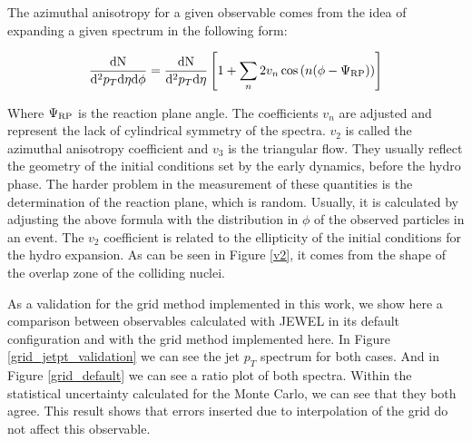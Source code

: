 


The azimuthal anisotropy for a given observable comes from the idea of expanding a given spectrum in the following form:

\begin{equation}
\frac{{\rm dN}}{{\rm d}^2p_T {\rm d}\eta {\rm d}\phi } = \frac{{\rm dN}}{{\rm d}^2p_T {\rm d}\eta } \left[ 1 + \sum_n 2 v_n \cos \left( n ( \phi - \Psi_{\rm RP} ) \right) \right]
\end{equation}

Where $\Psi_{\rm RP}$ is the reaction plane angle. The coefficients $v_n$ are adjusted and represent the lack of cylindrical symmetry of the spectra. $v_2$ is called the azimuthal anisotropy coefficient and $v_3$ is the triangular flow. They usually reflect the geometry of the initial conditions set by the early dynamics, before the hydro phase. The harder problem in the measurement of these quantities is the determination of the reaction plane, which is random. Usually, it is calculated by adjusting the above formula with the distribution in $\phi$ of the observed particles in an event. The $v_2$ coefficient is related to the ellipticity of the initial conditions for the hydro expansion. As can be seen in Figure \ref{v2}, it comes from the shape of the overlap zone of the colliding nuclei.


As a validation for the grid method implemented in this work, we show here a comparison between observables calculated with JEWEL in its default configuration and with the grid method implemented here. In Figure \ref{grid_jetpt_validation} we can see the jet $p_T$ spectrum for both cases. And in Figure \ref{grid_default} we can see a ratio plot of both spectra. Within the statistical uncertainty calculated for the Monte Carlo, we can see that they both agree. This result shows that errors inserted due to interpolation of the grid do not affect this observable.

